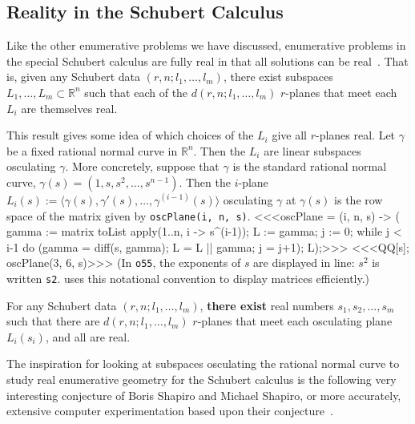 \subsection{Reality in the Schubert Calculus}\label{sec:shapiro}
Like the other enumerative problems we have discussed, enumerative problems
in the special Schubert calculus are fully
real in that all solutions can be 
real~\cite{SO:So99a}. 
That is, given any Schubert data $(r,n;l_1,\ldots,l_m)$, there exist 
subspaces $L_1,\ldots,L_m\subset{\mathbb R}^n$ such that each of the
$d(r,n;l_1,\ldots,l_m)$ $r$-planes that meet each $L_i$ are themselves
real.

This result gives some idea of which choices of the $L_i$ give
all $r$-planes real.
Let $\gamma$ be a fixed rational normal curve in ${\mathbb R}^n$.
Then the $L_i$ are linear subspaces osculating $\gamma$.
More concretely, suppose that $\gamma$ is the standard rational normal
curve,
$\gamma(s) = (1, s, s^2, \ldots, s^{n-1})$.
Then the $i$-plane 
$L_i(s):=\langle \gamma(s),\gamma'(s),\ldots,\gamma^{(i-1)}(s)\rangle$ 
osculating $\gamma$ at $\gamma(s)$ is the row space
of the matrix given by {\tt oscPlane(i, n, s)}.
%
<<<oscPlane = (i, n, s) -> (
     gamma := matrix {toList apply(1..n, i -> s^(i-1))};
     L := gamma;
     j := 0;
     while j < i-1 do (gamma = diff(s, gamma); 
          L = L || gamma;
          j = j+1);
     L);>>>
%
<<<QQ[s]; oscPlane(3, 6, s)>>>
%
(In {\tt o55}, the exponents of $s$ are displayed in line: $s^2$ is written
{\tt s2}.
\Mtwo{} uses this notational convention to display
matrices efficiently.) 


\begin{theorem}[\cite{SO:So99a}]\label{thm:special-reality}
For any Schubert data $(r,n;l_1,\ldots,l_m)$, {\bf there exist} real numbers
$s_1,s_2,\ldots,s_m$ such that there are $d(r,n;l_1,\ldots,l_m)$
$r$-planes that meet each osculating plane $L_i(s_i)$, and all are real.
\end{theorem}

The inspiration for looking at subspaces osculating the rational normal
curve to
study real enumerative geometry for the
Schubert calculus is the following very interesting 
conjecture of Boris Shapiro and Michael
Shapiro, or more accurately,
extensive computer experimentation based upon their
conjecture~\cite{SO:RS98,SO:So_shap-www,SO:So00b,SO:Ver00}.
\medskip


